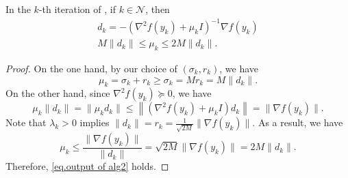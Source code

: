\documentclass{mcom-l}
\numberwithin{equation}{section}
\begin{document}
\begin{lemma}
    \label{lem.ratio pass nonzero}
    In the $k$-th iteration of , if $k\in\mathcal{N}$, then
    \begin{subequations}
        \label{eq.output of alg2}
        \begin{gather}
            d_k = -\left(\nabla^2 f(y_k)+\mu_k I \right)^{-1}\nabla f(y_k)\\
            M\|d_k\|\leq \mu_k \leq 2M\|d_k\|.
        \end{gather}
    \end{subequations}
\end{lemma}
\begin{proof}
    On the one hand, by our choice of $(\sigma_k,r_k)$, we have $$\mu_k=\sigma_k+r_k\geq\sigma_k= Mr_k= M\|d_k\|.$$
    On the other hand, since $\nabla^2 f(y_k)\succeq 0$, we have
    \begin{equation*}
        \mu_k\|d_k\|=\|\mu_kd_k\|\leq \left\|\left(\nabla^2 f(y_k)+\mu_k I\right)d_k\right\|=\|\nabla f(y_k)\|.
    \end{equation*}
    Note that $\lambda_k>0$ implies $\|d_k\|=r_k=\frac{1}{\sqrt{2M}}\|\nabla f(y_k)\|$. As a result, we have
    \begin{equation*}
        \mu_k\leq \frac{\|\nabla f(y_k)\|}{\|d_k\|}=\sqrt{2M}\|\nabla f(y_k)\|=2M\|d_k\|.
    \end{equation*}
    Therefore, \eqref{eq.output of alg2} holds.
\end{proof}
\end{document}
